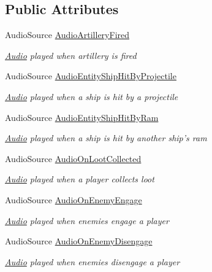 \subsection*{Public Attributes}
\begin{DoxyCompactItemize}
\item 
Audio\-Source \hyperlink{class_skyrates_1_1_audio_1_1_audio_dispatcher_aea6c867e733dcc4dbbf9b25b68aa4c08}{Audio\-Artillery\-Fired}
\begin{DoxyCompactList}\small\item\em \hyperlink{namespace_skyrates_1_1_audio}{Audio} played when artillery is fired \end{DoxyCompactList}\item 
Audio\-Source \hyperlink{class_skyrates_1_1_audio_1_1_audio_dispatcher_ac1ed48f44711cc8117e0d4246c4c395f}{Audio\-Entity\-Ship\-Hit\-By\-Projectile}
\begin{DoxyCompactList}\small\item\em \hyperlink{namespace_skyrates_1_1_audio}{Audio} played when a ship is hit by a projectile \end{DoxyCompactList}\item 
Audio\-Source \hyperlink{class_skyrates_1_1_audio_1_1_audio_dispatcher_a78f27d7e62592efb1f09fb343148c0e9}{Audio\-Entity\-Ship\-Hit\-By\-Ram}
\begin{DoxyCompactList}\small\item\em \hyperlink{namespace_skyrates_1_1_audio}{Audio} played when a ship is hit by another ship's ram \end{DoxyCompactList}\item 
Audio\-Source \hyperlink{class_skyrates_1_1_audio_1_1_audio_dispatcher_a17aa664c4fd2364854b960dbb87d6f9c}{Audio\-On\-Loot\-Collected}
\begin{DoxyCompactList}\small\item\em \hyperlink{namespace_skyrates_1_1_audio}{Audio} played when a player collects loot \end{DoxyCompactList}\item 
Audio\-Source \hyperlink{class_skyrates_1_1_audio_1_1_audio_dispatcher_ac81a741598771dc6e765d74df26d3abc}{Audio\-On\-Enemy\-Engage}
\begin{DoxyCompactList}\small\item\em \hyperlink{namespace_skyrates_1_1_audio}{Audio} played when enemies engage a player \end{DoxyCompactList}\item 
Audio\-Source \hyperlink{class_skyrates_1_1_audio_1_1_audio_dispatcher_a23c0754205f0048d214a2e9f4f2e1bbb}{Audio\-On\-Enemy\-Disengage}
\begin{DoxyCompactList}\small\item\em \hyperlink{namespace_skyrates_1_1_audio}{Audio} played when enemies disengage a player \end{DoxyCompactList}\end{DoxyCompactItemize}


